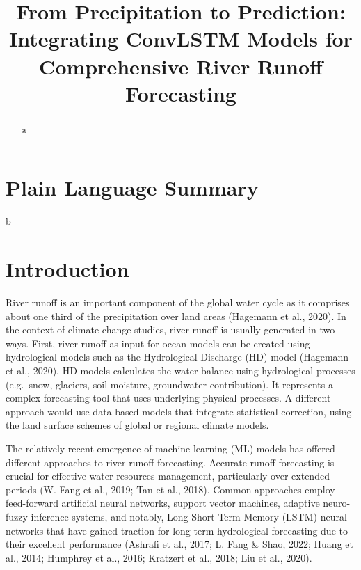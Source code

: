 \documentclass[
]{agujournal2019}
\begin{document}
\title{From Precipitation to Prediction: Integrating ConvLSTM Models for
Comprehensive River Runoff Forecasting}



\begin{abstract}
a
\end{abstract}

\section*{Plain Language Summary}
b


\ifdefined\Shaded\renewenvironment{Shaded}{\begin{tcolorbox}[breakable, interior hidden, borderline west={3pt}{0pt}{shadecolor}, enhanced, frame hidden, boxrule=0pt, sharp corners]}{\end{tcolorbox}}\fi

\hypertarget{introduction}{%
\section{Introduction}\label{introduction}}

River runoff is an important component of the global water cycle as it
comprises about one third of the precipitation over land areas (Hagemann
et al., 2020). In the context of climate change studies, river runoff is
usually generated in two ways. First, river runoff as input for ocean
models can be created using hydrological models such as the Hydrological
Discharge (HD) model (Hagemann et al., 2020). HD models calculates the
water balance using hydrological processes (e.g.~snow, glaciers, soil
moisture, groundwater contribution). It represents a complex forecasting
tool that uses underlying physical processes. A different approach would
use data-based models that integrate statistical correction, using the
land surface schemes of global or regional climate models.

The relatively recent emergence of machine learning (ML) models has
offered different approaches to river runoff forecasting. Accurate
runoff forecasting is crucial for effective water resources management,
particularly over extended periods (W. Fang et al., 2019; Tan et al.,
2018). Common approaches employ feed-forward artificial neural networks,
support vector machines, adaptive neuro-fuzzy inference systems, and
notably, Long Short-Term Memory (LSTM) neural networks that have gained
traction for long-term hydrological forecasting due to their excellent
performance (Ashrafi et al., 2017; L. Fang \& Shao, 2022; Huang et al.,
2014; Humphrey et al., 2016; Kratzert et al., 2018; Liu et al., 2020).
\end{document}
